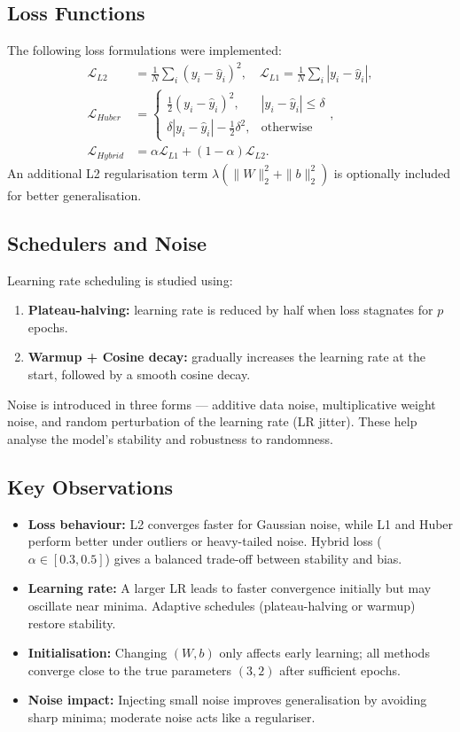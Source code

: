 \documentclass{article}
\begin{document}
\subsection{Loss Functions}
The following loss formulations were implemented:
\begin{align}
\mathcal{L}_{L2} &= \frac{1}{N}\sum_i (y_i-\hat{y}_i)^2, \quad
\mathcal{L}_{L1} = \frac{1}{N}\sum_i |y_i-\hat{y}_i|, \\
\mathcal{L}_{Huber} &= 
\begin{cases}
\frac{1}{2}(y_i-\hat{y}_i)^2, & |y_i-\hat{y}_i|\le \delta \\
\delta|y_i-\hat{y}_i| - \frac{1}{2}\delta^2, & \text{otherwise}
\end{cases}, \\
\mathcal{L}_{Hybrid} &= \alpha \mathcal{L}_{L1} + (1-\alpha)\mathcal{L}_{L2}.
\end{align}
An additional L2 regularisation term $\lambda(\|W\|_2^2 + \|b\|_2^2)$ is optionally included for better generalisation.

\subsection{Schedulers and Noise}
Learning rate scheduling is studied using:
\begin{enumerate}
    \item \textbf{Plateau-halving:} learning rate is reduced by half when loss stagnates for $p$ epochs.
    \item \textbf{Warmup + Cosine decay:} gradually increases the learning rate at the start, followed by a smooth cosine decay.
\end{enumerate}
Noise is introduced in three forms --- additive data noise, multiplicative weight noise, and random perturbation of the learning rate (LR jitter). These help analyse the model’s stability and robustness to randomness.

\subsection{Key Observations}
\begin{itemize}
    \item \textbf{Loss behaviour:} L2 converges faster for Gaussian noise, while L1 and Huber perform better under outliers or heavy-tailed noise. Hybrid loss ($\alpha \in [0.3,0.5]$) gives a balanced trade-off between stability and bias.
    \item \textbf{Learning rate:} A larger LR leads to faster convergence initially but may oscillate near minima. Adaptive schedules (plateau-halving or warmup) restore stability.
    \item \textbf{Initialisation:} Changing $(W,b)$ only affects early learning; all methods converge close to the true parameters $(3,2)$ after sufficient epochs.
    \item \textbf{Noise impact:} Injecting small noise improves generalisation by avoiding sharp minima; moderate noise acts like a regulariser.
\end{itemize}
\end{document}
